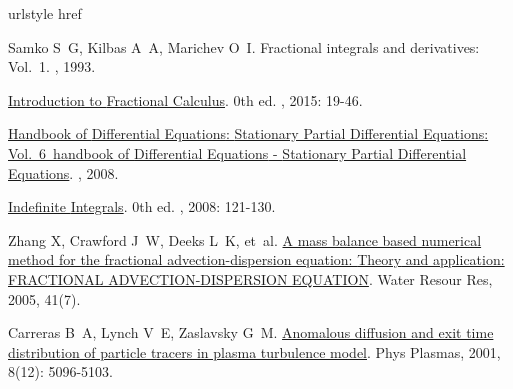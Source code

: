 \begin{thebibliography}{77}
    \providecommand{\natexlab}[1]{#1}
    \providecommand{\url}[1]{#1}
    \expandafter\ifx\csname urlstyle\endcsname\relax\else
      \fi
    \expandafter\ifx\csname href\endcsname\relax
      \DeclareUrlCommand{}
      \def\eprint#1#2{#2}
    \else
      \def\doi#1{\href{https://doi.org/#1}{\nolinkurl{#1}}}
      \let\eprint\href
    \fi
    
    Samko S~G, Kilbas A~A, Marichev O~I.
    \newblock Fractional integrals and derivatives: Vol.~1\allowbreak[M].
    , 1993.
    
    \href{https://www.taylorfrancis.com/books/9781482253818/chapters/10.1201/b18503-6}{Introduction to {{Fractional Calculus}}}\allowbreak[M].
    \newblock 0th ed.
    , 2015: 19-46.
    
    \href{https://linkinghub.elsevier.com/retrieve/pii/S1874573308X80167}{Handbook of {{Differential Equations}}: {{Stationary Partial Differential Equations}}: Vol.~6\ handbook of {{Differential Equations}} - {{Stationary Partial Differential Equations}}}\allowbreak[M].
    , 2008.
    
    \href{https://www.taylorfrancis.com/books/9781584889571/chapters/10.1201/9781584889571-7}{Indefinite {{Integrals}}}\allowbreak[M].
    \newblock 0th ed.
    , 2008: 121-130.
    
    Zhang X, Crawford J~W, Deeks L~K, et~al.
    \newblock \href{http://doi.wiley.com/10.1029/2004WR003818}{A mass balance based numerical method for the fractional advection-dispersion equation: {{Theory}} and application: {{FRACTIONAL ADVECTION-DISPERSION EQUATION}}}\allowbreak[J].
    \newblock Water Resour Res, 2005, 41\allowbreak (7).
    
    Carreras B~A, Lynch V~E, Zaslavsky G~M.
    \newblock \href{http://aip.scitation.org/doi/10.1063/1.1416180}{Anomalous diffusion and exit time distribution of particle tracers in plasma turbulence model}\allowbreak[J].
    \newblock Phys Plasmas, 2001, 8\allowbreak (12): 5096-5103.
    

\end{thebibliography}
